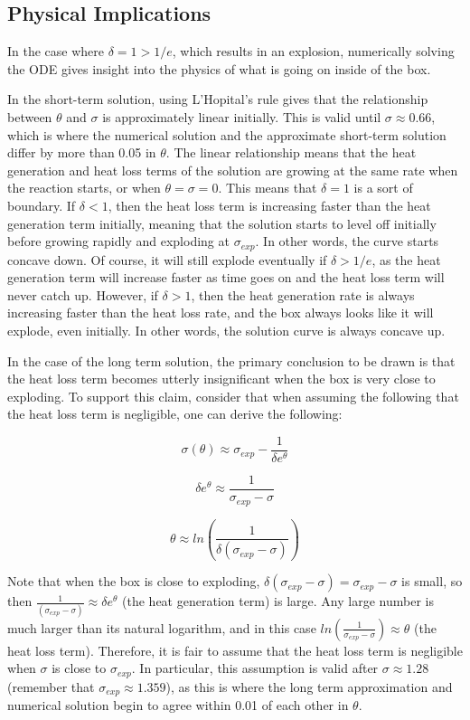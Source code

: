 \documentclass[12pt]{article}\pagestyle{myheadings}
\theoremstyle{plain}
\begin{document}
\FloatBarrier

\subsection{Physical Implications}

In the case where $\delta = 1 > 1/e$, which results in an explosion, numerically solving the ODE gives insight into the physics of what is going on inside of the box.

In the short-term solution, using L'Hopital's rule gives that the relationship between $\theta$ and $\sigma$ is approximately linear initially. This is valid until $\sigma \approx 0.66$, which is where the numerical solution and the approximate short-term solution differ by more than 0.05 in $\theta$. The linear relationship means that the heat generation and heat loss terms of the solution are growing at the same rate when the reaction starts, or when $\theta = \sigma = 0$. This means that $\delta = 1$ is a sort of boundary. If $\delta < 1$, then the heat loss term is increasing faster than the heat generation term initially, meaning that the solution starts to level off initially before growing rapidly and exploding at $\sigma_{exp}$. In other words, the curve starts concave down. Of course, it will still explode eventually if $\delta > 1/e$, as the heat generation term will increase faster as time goes on and the heat loss term will never catch up. However, if $\delta > 1$, then the heat generation rate is always increasing faster than the heat loss rate, and the box always looks like it will explode, even initially. In other words, the solution curve is always concave up.

In the case of the long term solution, the primary conclusion to be drawn is that the heat loss term becomes utterly insignificant when the box is very close to exploding. To support this claim, consider that when assuming the following that the heat loss term is negligible, one can derive the following:

{\[\sigma(\theta) \approx \sigma_{exp} - \frac{1}{\delta e^{\theta}}\]}

{\[\delta e^{\theta} \approx \frac{1}{\sigma_{exp} - \sigma}\]}

{\[\theta \approx ln\left(\frac{1}{\delta(\sigma_{exp} - \sigma)}\right)\]}

Note that when the box is close to exploding, $\delta(\sigma_{exp} - \sigma) = \sigma_{exp} - \sigma$ is small, so then $\frac{1}{(\sigma_{exp} - \sigma)} \approx \delta e^{\theta}$ (the heat generation term) is large. Any large number is much larger than its natural logarithm, and in this case $ln\left(\frac{1}{\sigma_{exp} - \sigma}\right) \approx \theta$ (the heat loss term). Therefore, it is fair to assume that the heat loss term is negligible when $\sigma$ is close to $\sigma_{exp}$. In particular, this assumption is valid after $\sigma \approx 1.28$ (remember that $\sigma_{exp} \approx 1.359$), as this is where the long term approximation and numerical solution begin to agree within 0.01 of each other in $\theta$.
\end{document}
